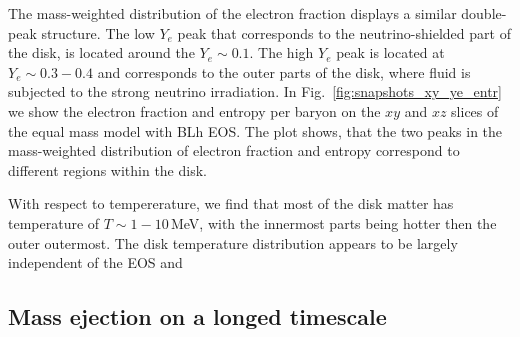 The mass-weighted distribution 
of the electron fraction displays a similar double-peak structure.
The low $Y_e$ peak that corresponds to the neutrino-shielded part of the 
disk, is located around the $Y_e\sim0.1$. The high $Y_e$ peak is located at 
$Y_e\sim0.3-0.4$ and corresponds to the outer parts of the disk,
where fluid is subjected to the strong neutrino irradiation.
%
In Fig.~\ref{fig:snapshots_xy_ye_entr} we show the electron fraction 
and entropy per baryon on the $xy$ and $xz$ slices of the equal 
mass model with BLh \ac{EOS}. The plot shows, that the two peaks in the 
mass-weighted distribution of electron fraction and entropy correspond to 
different regions within the disk.

With respect to tempererature, we find that 
most of the disk matter has temperature of $T\sim 1-10\,$MeV, with the 
innermost parts being hotter then the outer outermost. 
The disk temperature distribution appears to be largely 
independent of the \ac{EOS} and \mr{}



\subsection{Mass ejection on a longed timescale}


